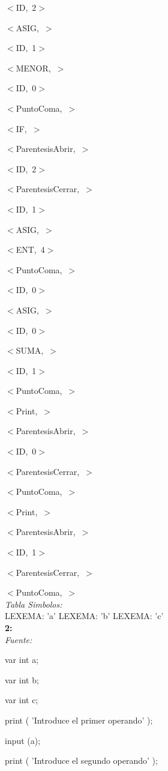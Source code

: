 \documentclass[a4paper, 12pt]{article}
\begin{document}
\mbox{$<$ID, 2$>$ }


\mbox{$<$ASIG, $>$ }


\mbox{$<$ID, 1$>$ }


\mbox{$<$MENOR, $>$ }


\mbox{$<$ID, 0$>$ }


\mbox{$<$PuntoComa, $>$ }


\mbox{$<$IF, $>$ }


\mbox{$<$ParentesisAbrir, $>$ }


\mbox{$<$ID, 2$>$ }


\mbox{$<$ParentesisCerrar, $>$}

 
\mbox{$<$ID, 1$>$ }


\mbox{$<$ASIG, $>$ }


\mbox{$<$ENT, 4$>$ }


\mbox{$<$PuntoComa, $>$} 


\mbox{$<$ID, 0$>$ }


\mbox{$<$ASIG, $>$ }


\mbox{$<$ID, 0$>$ }


\mbox{$<$SUMA, $>$ }


\mbox{$<$ID, 1$>$ }


\mbox{$<$PuntoComa, $>$ }


\mbox{$<$Print, $>$ }


\mbox{$<$ParentesisAbrir, $>$ }


\mbox{$<$ID, 0$>$ }


\mbox{$<$ParentesisCerrar, $>$ }


\mbox{$<$PuntoComa, $>$ }


\mbox{$<$Print, $>$ }


\mbox{$<$ParentesisAbrir, $>$ }


\mbox{$<$ID, 1$>$ }


\mbox{$<$ParentesisCerrar, $>$ }


\mbox{$<$PuntoComa, $>$ }\medskip\\
\emph{Tabla Simbolos:}\\ 
  LEXEMA: 'a'
  LEXEMA: 'b'
  LEXEMA: 'c'\bigskip \\
\textbf{2:}\medskip\\
\emph{Fuente:}

var int a;

var int b;

var int c;

print ( 'Introduce el primer operando' );

input (a);

print ( 'Introduce el segundo operando' );
\end{document}
